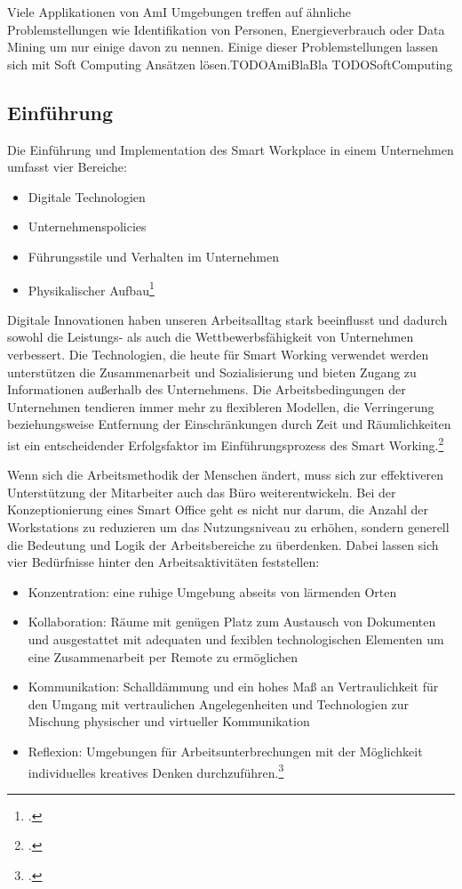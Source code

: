 Viele Applikationen von AmI Umgebungen treffen auf ähnliche Problemstellungen wie Identifikation von Personen, Energieverbrauch oder Data Mining um nur einige davon zu nennen. Einige dieser Problemstellungen lassen sich mit Soft Computing Ansätzen lösen.TODOAmiBlaBla TODOSoftComputing 

\subsection{Einführung}
Die Einführung und Implementation des Smart Workplace in einem Unternehmen umfasst vier Bereiche:

\begin{itemize}
\item[1.] Digitale Technologien
\item[2.] Unternehmenspolicies
\item[3.] Führungsstile und Verhalten im Unternehmen
\item[4.] Physikalischer Aufbau\footcite[Vgl.][]{efm}
\end{itemize}

Digitale Innovationen haben unseren Arbeitsalltag stark beeinflusst und dadurch sowohl die Leistungs- als auch die Wettbewerbsfähigkeit von Unternehmen verbessert. Die Technologien, die heute für Smart Working verwendet werden unterstützen die Zusammenarbeit und Sozialisierung und bieten Zugang zu Informationen außerhalb des Unternehmens. Die Arbeitsbedingungen der Unternehmen tendieren immer mehr zu flexibleren Modellen, die Verringerung beziehungsweise Entfernung der Einschränkungen durch Zeit und Räumlichkeiten ist ein entscheidender Erfolgsfaktor im Einführungsprozess des Smart Working.\footcite[Vgl.][]{efm}

Wenn sich die Arbeitsmethodik der Menschen ändert, muss sich zur effektiveren Unterstützung der Mitarbeiter auch das Büro weiterentwickeln. Bei der Konzeptionierung eines Smart Office geht es nicht nur darum, die Anzahl der Workstations zu reduzieren um das Nutzungsniveau zu erhöhen, sondern generell die Bedeutung und Logik der Arbeitsbereiche zu überdenken. Dabei lassen sich vier Bedürfnisse hinter den Arbeitsaktivitäten feststellen:

\begin{itemize}
\item Konzentration: eine ruhige Umgebung abseits von lärmenden Orten
\item Kollaboration: Räume mit genügen Platz zum Austausch von Dokumenten und ausgestattet mit adequaten und fexiblen technologischen Elementen um eine  Zusammenarbeit per Remote zu ermöglichen
\item Kommunikation: Schalldämmung und ein hohes Maß an Vertraulichkeit für den Umgang mit vertraulichen Angelegenheiten und Technologien zur Mischung physischer und virtueller Kommunikation
\item Reflexion: Umgebungen für Arbeitsunterbrechungen mit der Möglichkeit individuelles kreatives Denken durchzuführen.\footcite[Vgl.][]{efm}
\end{itemize}

